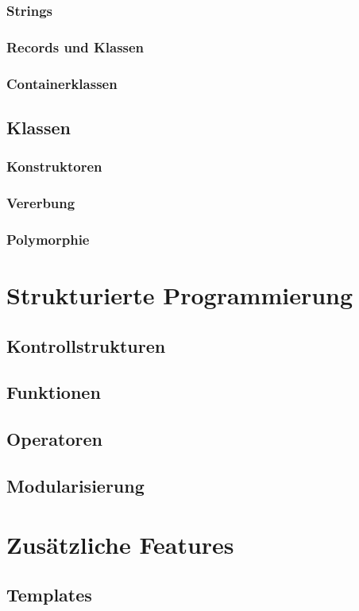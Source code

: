 \documentclass[a4paper]{report}
\begin{document}
\subsection{Strings}

\subsection{Records und Klassen}
\subsection{Containerklassen}
\section{Klassen}
\subsection{Konstruktoren}
\subsection{Vererbung}
\subsection{Polymorphie}

\chapter{Strukturierte Programmierung}
\section{Kontrollstrukturen}
\section{Funktionen}
\section{Operatoren}
\section{Modularisierung}

\chapter{Zusätzliche Features}
\section{Templates}
\end{document}
